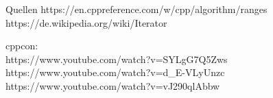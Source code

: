 \begin{frame}{Quellen}
    https://en.cppreference.com/w/cpp/algorithm/ranges
    https://de.wikipedia.org/wiki/Iterator

    \vspace{2em}

    cppcon:\\
    https://www.youtube.com/watch?v=SYLgG7Q5Zws
    https://www.youtube.com/watch?v=d\_E-VLyUnzc
    https://www.youtube.com/watch?v=vJ290qlAbbw
\end{frame}